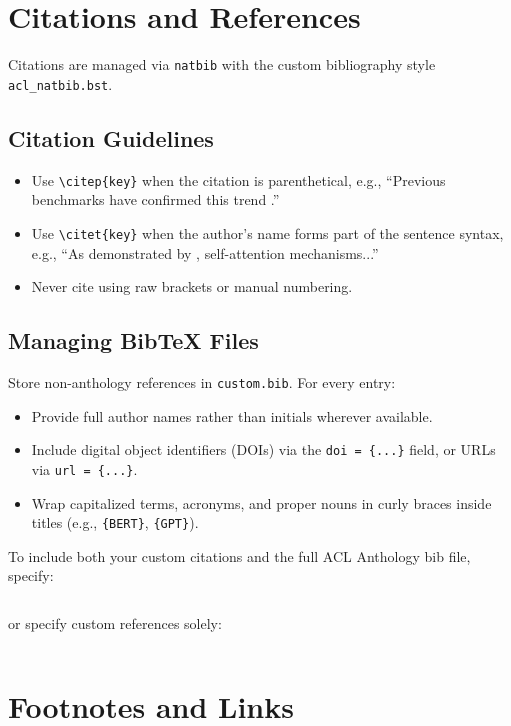 \documentclass[11pt]{article}
\begin{document}
\section{Citations and References}
\label{sec:citations}

Citations are managed via \texttt{natbib} with the custom bibliography style \texttt{acl\_natbib.bst}.

\subsection{Citation Guidelines}
\begin{itemize}
    \item Use \verb|\citep{key}| when the citation is parenthetical, e.g., ``Previous benchmarks have confirmed this trend \citep{Ando2005}.''
    \item Use \verb|\citet{key}| when the author's name forms part of the sentence syntax, e.g., ``As demonstrated by \citet{Vaswani2017}, self-attention mechanisms...''
    \item Never cite using raw brackets or manual numbering.
\end{itemize}

\subsection{Managing Bib\TeX{} Files}
Store non-anthology references in \texttt{custom.bib}. For every entry:
\begin{itemize}
    \item Provide full author names rather than initials wherever available.
    \item Include digital object identifiers (DOIs) via the \texttt{doi = \{...\}} field, or URLs via \texttt{url = \{...\}}.
    \item Wrap capitalized terms, acronyms, and proper nouns in curly braces inside titles (e.g., \verb|{BERT}|, \verb|{GPT}|).
\end{itemize}
To include both your custom citations and the full ACL Anthology bib file, specify:
\begin{verbatim}

\end{verbatim}
or specify custom references solely:
\begin{verbatim}

\end{verbatim}

\section{Footnotes and Links}
\label{sec:links}
\end{document}
